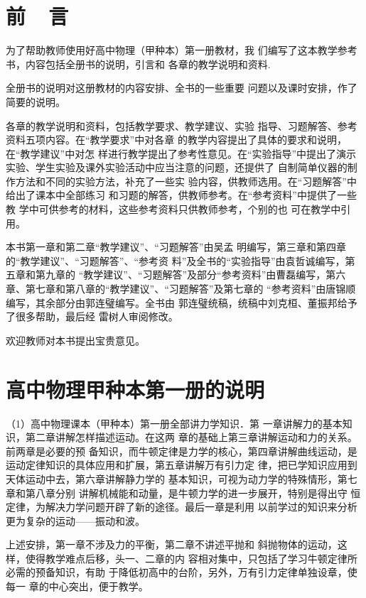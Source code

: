\chapter{前~~言}

为了帮助教师使用好高中物理（甲种本）第一册教材，我
们编写了这本教学参考书，内容包括全册书的说明，引言和
各章的教学说明和资料.

全册书的说明对这册教材的内容安排、全书的一些重要
问题以及课时安排，作了简要的说明。

各章的教学说明和资料，包括教学要求、教学建议、实验
指导、习题解答、参考资料五项内容。在“教学要求”中对各章
的教学内容提出了具体的要求和说明，在“教学建议”中对怎
样进行教学提出了参考性意见。在“实验指导”中提出了演示
实验、学生实验及课外实验活动中应当注意的问题，还提供了
自制简单仪器的制作方法和不同的实验方法，补充了一些实
验内容，供教师选用。在“习题解答”中给出了课本中全部练习
和习题的解答，供教师参考。在“参考资料”中提供了一些教
学中可供参考的材料，这些参考资料只供教师参考，个别的也
可在教学中引用。

本书第一章和第二章“教学建议”、“习题解答”由吴孟
明编写，第三章和第四章的“教学建议”、“习题解答”、“参考资
料”及全书的“实验指导”由袁哲诚编写，第五章和第九章的
“教学建议”、“习题解答”及部分“参考资料”由曹磊编写，第六
章、第七章和第八章的“教学建议”、“习题解答”及第七章的
“参考资料”由唐锦顺编写，其余部分由郭连璧编写。全书由
郭连璧统稿，统稿中刘克桓、董振邦给予了很多帮助，最后经
雷树人审阅修改。

欢迎教师对本书提出宝贵意见。


\chapter{高中物理甲种本第一册的说明}

（1）高中物理课本（甲种本）第一册全部讲力学知识．第
一章讲解力的基本知识，第二章讲解怎样描述运动。在这两
章的基础上第三章讲解运动和力的关系。前两章是必要的预
备知识，而牛顿定律是力学的核心，第四章讲解曲线运动，是
运动定律知识的具体应用和扩展，第五章讲解万有引力定
律，把已学知识应用到天体运动中去，第六章讲解静力学的
基本知识，可视为动力学的特殊情形，第七章和第八章分别
讲解机械能和动量，是牛顿力学的进一步展开，特别是得出守
恒定律，为解决力学问题开辟了新的途径。最后一章是利用
以前学过的知识来分析更为复杂的运动——振动和波。

上述安排，第一章不涉及力的平衡，第二章不讲述平抛和
斜抛物体的运动，这样，使得教学难点后移，头一、二章的内
容相对集中，只包括了学习牛顿定律所必需的预备知识，有助
于降低初高中的台阶，另外，万有引力定律单独设章，使每一
章的中心突出，便于教学。

